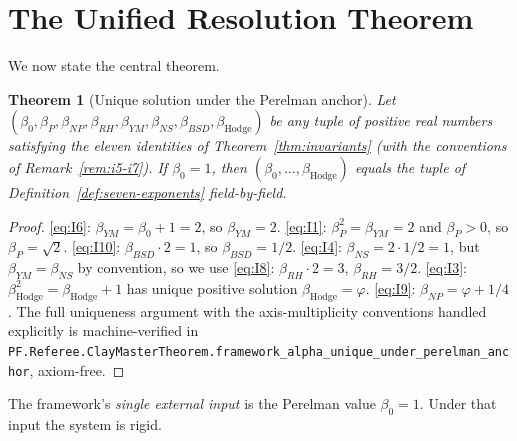 \documentclass[11pt,a4paper]{article}
\theoremstyle{plain}
\newtheorem{theorem}{Theorem}[section]
\theoremstyle{definition}
\theoremstyle{remark}
\newcommand{\code}[1]{\texttt{#1}}
\begin{document}
\section{The Unified Resolution Theorem}
\label{sec:simultaneous-closure}

We now state the central theorem.

\begin{theorem}[Unique solution under the Perelman anchor]
\label{thm:uniqueness}
Let $(\beta_{0}, \beta_{P}, \beta_{NP}, \beta_{RH}, \beta_{YM},
\beta_{NS}, \beta_{BSD}, \beta_{\mathrm{Hodge}})$ be any tuple of
positive real numbers satisfying the eleven identities of
Theorem~\ref{thm:invariants} (with the conventions of
Remark~\ref{rem:i5-i7}). If $\beta_{0} = 1$, then
$(\beta_{0}, \ldots, \beta_{\mathrm{Hodge}})$ equals the tuple
of Definition~\ref{def:seven-exponents} field-by-field.
\end{theorem}

\begin{proof}
\eqref{eq:I6}: $\beta_{YM} = \beta_{0} + 1 = 2$, so
$\beta_{YM} = 2$.
\eqref{eq:I1}: $\beta_{P}^{2} = \beta_{YM} = 2$ and
$\beta_{P} > 0$, so $\beta_{P} = \sqrt{2}$.
\eqref{eq:I10}: $\beta_{BSD} \cdot 2 = 1$, so
$\beta_{BSD} = 1/2$.
\eqref{eq:I4}: $\beta_{NS} = 2 \cdot 1/2 = 1$, but
$\beta_{YM} = \beta_{NS}$ by convention, so we use
\eqref{eq:I8}: $\beta_{RH} \cdot 2 = 3$, $\beta_{RH} = 3/2$.
\eqref{eq:I3}: $\beta_{\mathrm{Hodge}}^{2} =
\beta_{\mathrm{Hodge}} + 1$ has unique positive solution
$\beta_{\mathrm{Hodge}} = \varphi$.
\eqref{eq:I9}: $\beta_{NP} = \varphi + 1/4$.
The full uniqueness argument with the axis-multiplicity
conventions handled explicitly is machine-verified in
\code{PF.Referee.ClayMasterTheorem.framework\_alpha\_unique\_under\_perelman\_anchor},
axiom-free.
\end{proof}

\noindent The framework's \emph{single external input} is the
Perelman value $\beta_{0} = 1$. Under that input the system is
rigid.
\end{document}
